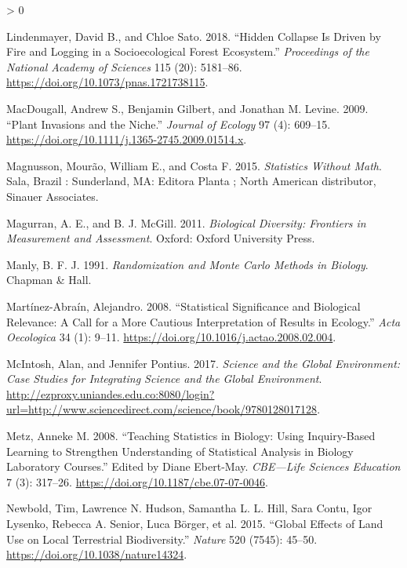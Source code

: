 \documentclass[
]{article}
\newlength{\cslhangindent}
\newenvironment{CSLReferences}[2] %
 {%
  \setlength{\parindent}{0pt}
  \ifodd #1 \everypar{\setlength{\hangindent}{\cslhangindent}}\ignorespaces\fi
  \ifnum #2 > 0
  \setlength{\parskip}{#2\baselineskip}
  \fi
 }%
 {}
\begin{document}
\begin{CSLReferences}{1}{0}
\leavevmode\hypertarget{ref-lindenmayer_hidden_2018}{}%
Lindenmayer, David B., and Chloe Sato. 2018. {``Hidden Collapse Is Driven by Fire and Logging in a Socioecological Forest Ecosystem.''} \emph{Proceedings of the National Academy of Sciences} 115 (20): 5181--86. \url{https://doi.org/10.1073/pnas.1721738115}.

\leavevmode\hypertarget{ref-macdougall_plant_2009}{}%
MacDougall, Andrew S., Benjamin Gilbert, and Jonathan M. Levine. 2009. {``Plant Invasions and the Niche.''} \emph{Journal of Ecology} 97 (4): 609--15. \url{https://doi.org/10.1111/j.1365-2745.2009.01514.x}.

\leavevmode\hypertarget{ref-magnusson_statistics_2015}{}%
Magnusson, Mourão, William E., and Costa F. 2015. \emph{Statistics Without Math}. Sala, Brazil : Sunderland, MA: Editora Planta ; North American distributor, Sinauer Associates.

\leavevmode\hypertarget{ref-magurran_biological_2011}{}%
Magurran, A. E., and B. J. McGill. 2011. \emph{Biological {Diversity}: {Frontiers} in {Measurement} and {Assessment}}. Oxford: Oxford University Press.

\leavevmode\hypertarget{ref-manly_randomization_1991}{}%
Manly, B. F. J. 1991. \emph{Randomization and {Monte} {Carlo} Methods in Biology}. Chapman \& Hall.

\leavevmode\hypertarget{ref-martinez-abrain_statistical_2008}{}%
Martínez-Abraín, Alejandro. 2008. {``Statistical Significance and Biological Relevance: {A} Call for a More Cautious Interpretation of Results in Ecology.''} \emph{Acta Oecologica} 34 (1): 9--11. \url{https://doi.org/10.1016/j.actao.2008.02.004}.

\leavevmode\hypertarget{ref-mcintosh_science_2017}{}%
McIntosh, Alan, and Jennifer Pontius. 2017. \emph{Science and the Global Environment: Case Studies for Integrating Science and the Global Environment}. \url{http://ezproxy.uniandes.edu.co:8080/login?url=http://www.sciencedirect.com/science/book/9780128017128}.

\leavevmode\hypertarget{ref-metz_teaching_2008}{}%
Metz, Anneke M. 2008. {``Teaching {Statistics} in {Biology}: {Using} {Inquiry}-Based {Learning} to {Strengthen} {Understanding} of {Statistical} {Analysis} in {Biology} {Laboratory} {Courses}.''} Edited by Diane Ebert-May. \emph{CBE---Life Sciences Education} 7 (3): 317--26. \url{https://doi.org/10.1187/cbe.07-07-0046}.

\leavevmode\hypertarget{ref-newbold_global_2015}{}%
Newbold, Tim, Lawrence N. Hudson, Samantha L. L. Hill, Sara Contu, Igor Lysenko, Rebecca A. Senior, Luca Börger, et al. 2015. {``Global Effects of Land Use on Local Terrestrial Biodiversity.''} \emph{Nature} 520 (7545): 45--50. \url{https://doi.org/10.1038/nature14324}.


\end{CSLReferences}
\end{document}
